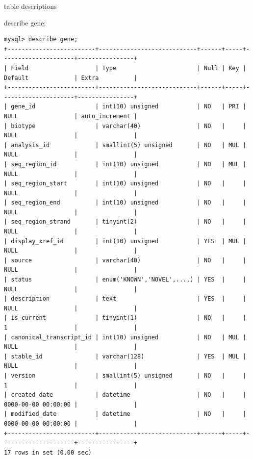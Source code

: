 \documentclass[pdf]{beamer}
\begin{document}
\begin{frame}[fragile]{table descriptions}
  \begin{sqlcode}
    describe gene;
  \end{sqlcode}

  { \tiny \hspace{-1cm}
\begin{verbatim}
mysql> describe gene;
+-------------------------+----------------------------+------+-----+---------------------+----------------+
| Field                   | Type                       | Null | Key | Default             | Extra          |
+-------------------------+----------------------------+------+-----+---------------------+----------------+
| gene_id                 | int(10) unsigned           | NO   | PRI | NULL                | auto_increment |
| biotype                 | varchar(40)                | NO   |     | NULL                |                |
| analysis_id             | smallint(5) unsigned       | NO   | MUL | NULL                |                |
| seq_region_id           | int(10) unsigned           | NO   | MUL | NULL                |                |
| seq_region_start        | int(10) unsigned           | NO   |     | NULL                |                |
| seq_region_end          | int(10) unsigned           | NO   |     | NULL                |                |
| seq_region_strand       | tinyint(2)                 | NO   |     | NULL                |                |
| display_xref_id         | int(10) unsigned           | YES  | MUL | NULL                |                |
| source                  | varchar(40)                | NO   |     | NULL                |                |
| status                  | enum('KNOWN','NOVEL',...,) | YES  |     | NULL                |                |
| description             | text                       | YES  |     | NULL                |                |
| is_current              | tinyint(1)                 | NO   |     | 1                   |                |
| canonical_transcript_id | int(10) unsigned           | NO   | MUL | NULL                |                |
| stable_id               | varchar(128)               | YES  | MUL | NULL                |                |
| version                 | smallint(5) unsigned       | NO   |     | 1                   |                |
| created_date            | datetime                   | NO   |     | 0000-00-00 00:00:00 |                |
| modified_date           | datetime                   | NO   |     | 0000-00-00 00:00:00 |                |
+-------------------------+----------------------------+------+-----+---------------------+----------------+
17 rows in set (0.00 sec)

\end{verbatim}
}
\end{frame}
\end{document}
